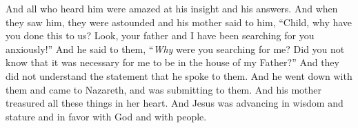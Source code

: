 \begin{biblechapter}
\verse And all who heard him were amazed at his insight and his answers.
\verse And when they saw him, they were astounded and his mother said to him, “Child, why have you done this to us? Look, your father and I have been searching for you anxiously!”
\verse And he said to them, “\textit{Why} were you searching for me? Did you not know that it was necessary for me to be in the house of my Father?”
\verse And they did not understand the statement that he spoke to them.
\verse And he went down with them and came to Nazareth, and was submitting to them. And his mother treasured all these things in her heart.
\verse And Jesus was advancing in wisdom and stature and in favor with God and with people.
\end{biblechapter}

